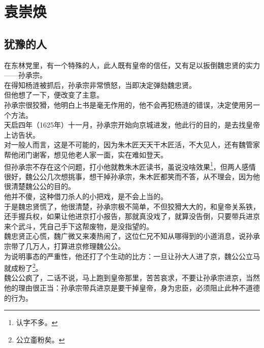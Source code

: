 \section{袁崇焕}
\ifnum{}
	\begin{multicols}{\theparacolNo}
\fi
\subsection{犹豫的人}
在东林党里，有一个特殊的人，此人既有皇帝的信任，又有足以扳倒魏忠贤的实力——孙承宗。\\

在得知杨涟被抓后，孙承宗非常愤怒，当即决定弹劾魏忠贤。\\

但他想了一下，便改变了主意。\\

孙承宗很狡猾，他明白上书是毫无作用的，他不会再犯杨涟的错误，决定使用另一个方法。\\

天启四年（1625年）十一月，孙承宗开始向京城进发，他此行的目的，是去找皇帝上访告状。\\

对一般人而言，这是不可能的，因为朱木匠天天干木匠活，不大见人，还有魏管家帮他闭门谢客，想见他老人家一面，实在难如登天。\\

但孙承宗不存在这个问题，打小他就教朱木匠读书，虽说没啥效果\footnote{认字不多。}，但两人感情很好，魏公公几次想挑事，想干掉孙承宗，朱木匠都笑而不答，从不理会，因为他很清楚魏公公的目的。\\

他并不傻，这种借刀杀人的小把戏，是不会上当的。\\

于是魏忠贤慌了，他很清楚，孙承宗极不简单，不但狡猾大大的，和皇帝关系铁，还手握兵权，如果让他进京打小报告，那就真没戏了，就算没告倒，只要带兵进京来个武斗，凭自己手下这帮废物，是没指望的。\\

魏忠贤正心慌，魏广微又来凑热闹了，这位仁兄不知从哪得到的小道消息，说孙承宗带了几万人，打算进京修理魏公公。\\

为说明事态的严重性，他还打了个生动的比方：一旦让孙大人进了京，魏公公立马就成粉了\footnote{公立齑粉矣。}。\\

魏公公疯了，二话不说，马上跑到皇帝那里，苦苦哀求，不要让孙承宗进京，当然他的理由很正当：孙承宗带兵进京是要干掉皇帝，身为忠臣，必须阻止此种不道德的行为。\\


\end{multicols}
